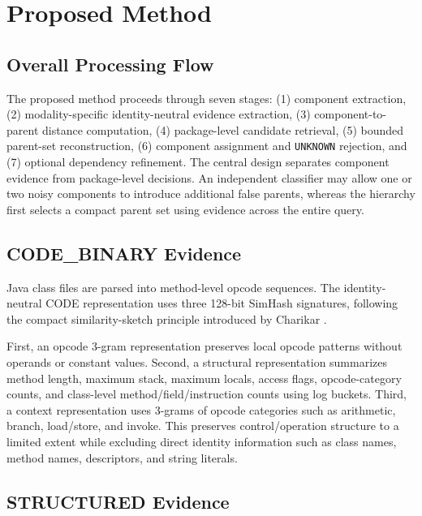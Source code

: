 \documentclass[runningheads]{llncs}
\begin{document}
\section{Proposed Method}

\subsection{Overall Processing Flow}

The proposed method proceeds through seven stages: (1) component extraction, (2) modality-specific identity-neutral evidence extraction, (3) component-to-parent distance computation, (4) package-level candidate retrieval, (5) bounded parent-set reconstruction, (6) component assignment and \texttt{UNKNOWN} rejection, and (7) optional dependency refinement. The central design separates component evidence from package-level decisions. An independent classifier may allow one or two noisy components to introduce additional false parents, whereas the hierarchy first selects a compact parent set using evidence across the entire query.

\subsection{CODE\_BINARY Evidence}

Java class files are parsed into method-level opcode sequences. The identity-neutral CODE representation uses three 128-bit SimHash signatures, following the compact similarity-sketch principle introduced by Charikar \cite{charikar2002simhash}.

First, an opcode 3-gram representation preserves local opcode patterns without operands or constant values. Second, a structural representation summarizes method length, maximum stack, maximum locals, access flags, opcode-category counts, and class-level method/field/instruction counts using log buckets. Third, a context representation uses 3-grams of opcode categories such as arithmetic, branch, load/store, and invoke. This preserves control/operation structure to a limited extent while excluding direct identity information such as class names, method names, descriptors, and string literals.

\subsection{STRUCTURED Evidence}
\end{document}
